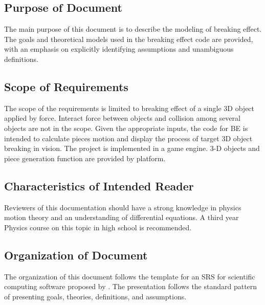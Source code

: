 \documentclass[12pt]{article}
\begin{document}
	
	\subsection{Purpose of Document}
	
	The main purpose of this document is to describe the modeling of breaking effect. The goals and theoretical models used in the breaking effect code are provided, with an emphasis on explicitly identifying assumptions and unambiguous definitions. 
	
	\subsection{Scope of Requirements} 
	
	The scope of the requirements is limited to breaking effect of a single 3D object applied by force. Interact force between objects and collision among several objects are not in the scope. Given the appropriate inputs, the code for BE is intended to calculate pieces motion and display the process of target 3D object breaking in vision. The project is implemented in a game engine. 3-D objects and piece generation function are provided by platform. 
	
	\subsection{Characteristics of Intended Reader} 
	
	Reviewers of this documentation should have a strong knowledge in physics motion theory and an understanding of differential equations. A third year Physics course on this topic in high school is recommended.   
	
	\subsection{Organization of Document}
	
	The organization of this document follows the template for an SRS for scientific
	computing software proposed by \citet{SmithAndLai2005, SmithEtAl2007}.  The
	presentation follows the standard pattern of presenting goals, theories,
	definitions, and assumptions. 
	
\end{document}
